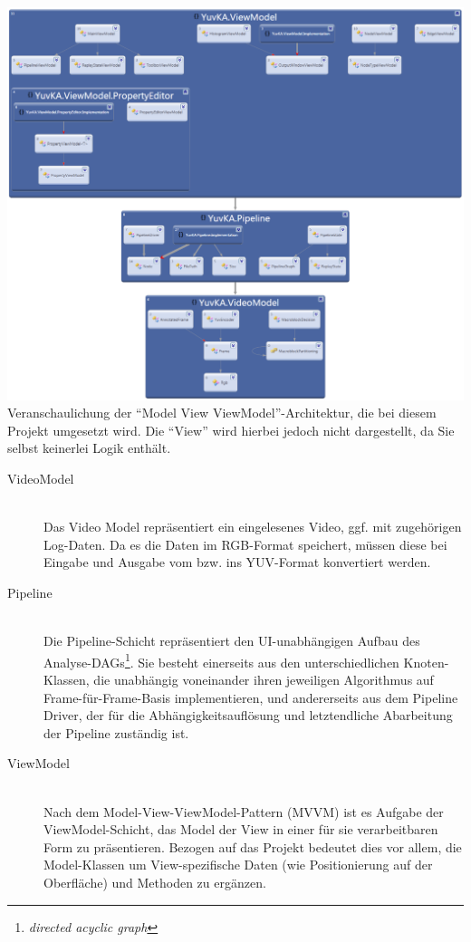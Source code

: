 \includegraphics[width=\textwidth]{Diagrams/namespacedependencies.png}
Veranschaulichung der ``Model View ViewModel''-Architektur, die bei diesem Projekt umgesetzt wird. Die ``View'' wird hierbei jedoch nicht dargestellt, da Sie selbst keinerlei Logik enthält.
\begin{description}
	\item[VideoModel]~\\
	Das Video Model repräsentiert ein eingelesenes Video, ggf. mit zugehörigen Log-Daten. Da es die Daten im RGB-Format speichert, müssen diese bei Eingabe und Ausgabe vom bzw. ins YUV-Format konvertiert
werden.

	\item[Pipeline]~\\
	Die Pipeline-Schicht repräsentiert den UI-unabhängigen Aufbau des Analyse-DAGs\footnote{\emph{directed acyclic graph}}. Sie besteht einerseits aus den unterschiedlichen Knoten-Klassen, die unabhängig voneinander ihren jeweiligen Algorithmus auf Frame-für-Frame-Basis implementieren, und andererseits aus dem Pipeline Driver, der für die Abhängigkeitsauflösung und letztendliche Abarbeitung der Pipeline zuständig ist.
	
	\item[ViewModel]~\\
	Nach dem Model-View-ViewModel-Pattern (MVVM) ist es Aufgabe der ViewModel-Schicht, das Model der View in einer für sie verarbeitbaren Form zu präsentieren. Bezogen auf das Projekt bedeutet dies vor allem, die Model-Klassen um View-spezifische Daten (wie Positionierung auf der Oberfläche) und Methoden zu ergänzen.

\end{description}



